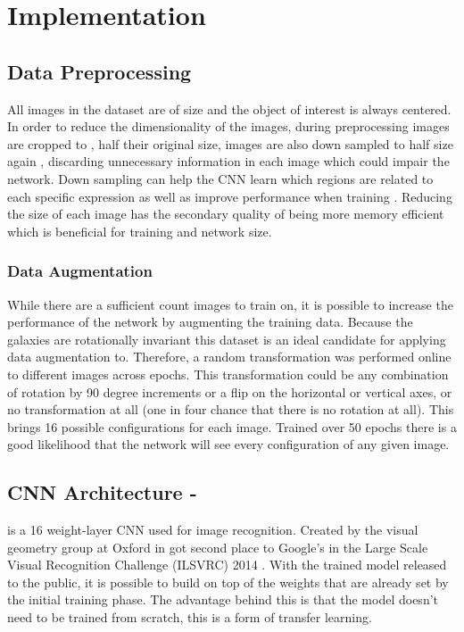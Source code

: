 \section{Implementation}


\subsection{Data Preprocessing}

All images in the dataset are of size  and the object of interest is always centered. In order to reduce the dimensionality of the images, during preprocessing images are cropped to , half their original size, images are also down sampled to half size again , discarding unnecessary information in each image which could impair the network. Down sampling can help the CNN learn which regions are related to each specific expression as well as improve performance when training \cite{deep-learning-review}. Reducing the size of each image has the secondary quality of being more memory efficient which is beneficial for training and network size.

\subsubsection{Data Augmentation}\label{aug}
While there are a sufficient count images to train on, it is possible to increase the performance of the network by augmenting the training data. Because the galaxies are rotationally invariant this dataset is an ideal candidate for applying data augmentation to. Therefore, a random transformation was performed online to different images across epochs. This transformation could be any combination of rotation by 90 degree increments or a flip on the horizontal or vertical axes, or no transformation at all (one in four chance that there is no rotation at all). This brings 16 possible configurations for each image. Trained over 50 epochs there is a good likelihood that the network will see every configuration of any given image.

\subsection{CNN Architecture - \vgg}

\vgg is a 16 weight-layer CNN used for image recognition. Created by the visual geometry group at Oxford in \citeyear{vgg16-arxiv} \vgg got second place to Google's \gnet in the Large Scale Visual Recognition Challenge (ILSVRC) 2014 \cite{vgg16-arxiv}. With the trained model released to the public, it is possible to build on top of the weights that are already set by the initial training phase. The advantage behind this is that the model doesn't need to be trained from scratch, this is a form of transfer learning.


